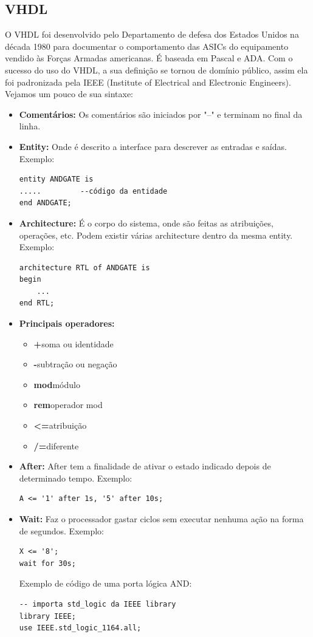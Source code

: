 \documentclass[12pt,a4paper]{article}
\begin{document}
\subsection{VHDL}
O VHDL foi desenvolvido  pelo Departamento de defesa dos Estados Unidos na década 1980 para documentar o comportamento das ASICs do equipamento vendido às Forças Armadas americanas. É baseada em Pascal e ADA.
Com o sucesso do uso do VHDL, a sua definição se tornou de domínio público, assim ela foi padronizada pela IEEE  (Institute of Electrical and Electronic Engineers). Vejamos um pouco de sua sintaxe:
\begin{itemize}
\item {\bf Comentários:} Os comentários são iniciados por "--" e terminam no final da linha. 

\item {\bf Entity:} Onde é descrito a interface para descrever as entradas e saídas. Exemplo:
\begin{verbatim}
entity ANDGATE is 
.....         --código da entidade
end ANDGATE;
\end{verbatim}
\item {\bf Architecture:} É o corpo do sistema, onde são feitas as atribuições, operações, etc. Podem existir várias architecture dentro da mesma entity. Exemplo:
\begin{verbatim}
architecture RTL of ANDGATE is 
begin
	...
end RTL;
\end{verbatim}
\item {\bf Principais operadores:}
\begin{itemize}
\item {\bf +}\quad  soma ou identidade
\item {\bf -}\quad subtração ou negação
\item {\bf mod}\quad módulo
\item {\bf rem}\quad operador mod
\item {\bf <=}\quad atribuição
\item {\bf /=}\quad diferente
\end{itemize}
\item {\bf After:} After tem a finalidade de ativar o estado indicado depois de determinado tempo. Exemplo:
\begin{verbatim}
A <= '1' after 1s, '5' after 10s;
\end{verbatim}
\item {\bf Wait:} Faz o processador gastar ciclos sem executar nenhuma ação na forma de segundos. Exemplo:
\begin{verbatim}
X <= '8';
wait for 30s;
\end{verbatim}
Exemplo de código de uma porta lógica AND:
\begin{verbatim}
-- importa std_logic da IEEE library
library IEEE;
use IEEE.std_logic_1164.all;


\end{verbatim}
\end{itemize}
\end{document}
